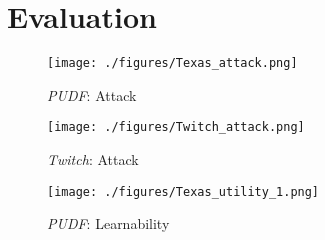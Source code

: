 \newcommand{\calib}{\texttt{Cal}}
\section{Evaluation}\label{sec:eval}
\vspace{-1.5em}
\begin{figure*}[ht]
   \begin{subfigure}[b]{0.25\linewidth}
       \centering
       \texttt{[image: ./figures/Texas\_attack.png]}
       \caption{\textit{PUDF}: Attack}
       \label{fig:Texas:attack}
    \end{subfigure}%
    \begin{subfigure}[b]{0.25\linewidth}
        \centering
        \texttt{[image: ./figures/Twitch\_attack.png]}
        \caption{\textit{Twitch}: Attack}
        \label{fig:Twitch:attack}
    \end{subfigure}%
    \begin{subfigure}[b]{0.25\linewidth}
        \centering
        \texttt{[image: ./figures/Texas\_utility\_1.png]}
        \caption{\textit{PUDF}: Learnability}
        \label{fig:Texas:utility}
    \end{subfigure}%

\end{figure*}

